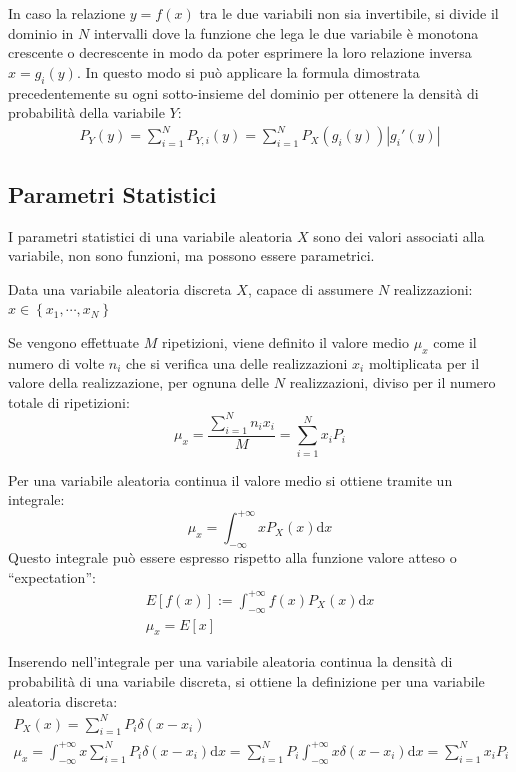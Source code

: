 \documentclass{article}
\newcommand{\df}{\mathrm{d}}
\newcommand{\intinf}{\displaystyle\int_{-\infty}^{+\infty}}
\numberwithin{equation}{subsection}
\begin{document}
In caso la relazione $y=f(x)$ tra le due variabili non sia invertibile, si divide il dominio in $N$ intervalli dove la funzione che lega le due variabile è monotona crescente o 
decrescente in modo da poter esprimere la loro relazione inversa $x=g_i(y)$. In questo modo si può applicare la formula dimostrata precedentemente su ogni 
sotto-insieme del dominio per ottenere la densità di probabilità della variabile $Y$:
\begin{gather*}
    P_Y(y)=\displaystyle\sum_{i=1}^NP_{Y,i}(y)=\sum_{i=1}^NP_X(g_i(y))|g_i'(y)|
\end{gather*} 

\subsection{Parametri Statistici}
\label{sec:parametri-statistici}

I parametri statistici di una variabile aleatoria $X$ sono dei valori associati alla variabile, non sono funzioni, ma possono essere parametrici. 

Data una variabile aleatoria discreta $X$, capace di assumere $N$ realizzazioni: $x\in\left\{x_1,\cdots,x_N\right\}$

Se vengono effettuate $M$ ripetizioni, viene definito il valore medio $\mu_x$ come il numero di volte $n_i$ che si verifica una delle realizzazioni $x_i$ moltiplicata per 
il valore della realizzazione, per ognuna delle $N$ realizzazioni, diviso per il numero totale di ripetizioni:
\begin{equation}
    \mu_x=\displaystyle\frac{\displaystyle\sum_{i=1}^Nn_ix_i}{M}=\sum_{i=1}^Nx_iP_i
\end{equation}

Per una variabile aleatoria continua il valore medio si ottiene tramite un integrale:
\begin{equation}
    \mu_x=\displaystyle\int_{-\infty}^{+\infty}xP_X(x)\df x
\end{equation}
Questo integrale può essere espresso rispetto alla funzione valore atteso o ``expectation'':
\begin{gather}
    E[f(x)]:=\intinf f(x)P_X(x)\df x\\
    \mu_x=E[x]
\end{gather}


Inserendo nell'integrale per una variabile aleatoria continua la densità di probabilità di una variabile discreta, si ottiene la definizione per una variabile aleatoria discreta:
\begin{gather*}
    P_X(x)=\displaystyle\sum_{i=1}^NP_i\delta(x-x_i)\\
    \mu_x=\displaystyle\int_{-\infty}^{+\infty}x\sum_{i=1}^NP_i\delta(x-x_i)\df x=\sum_{i=1}^NP_i\int_{-\infty}^{+\infty}x\delta(x-x_i)\df x=\sum_{i=1}^Nx_iP_i
\end{gather*}
\end{document}
